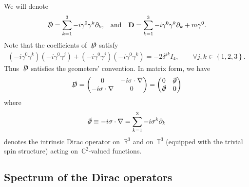 \documentclass[11pt,final]{amsart}
\newcommand{\braces}[1]{\left\{#1\right\}} %
\newcommand{\R}{\mathbb{R}}
\newcommand{\C}{\mathbb{C}}
\newcommand{\p}{\partial}
\newcommand{\D}{\slashed{D}}
\newcommand{\pd}{\slashed{\partial}}
\newcommand{\pD}{\mathbf{D}}
\begin{document}
We will denote
\begin{align}
    \D= \sum_{k=1}^3 -i\gamma^0\gamma^k\p_k, & &
    \mbox{and} & &
    \pD=\sum_{k=1}^3 -i\gamma^0\gamma^k\p_k+m\gamma^0 .
\end{align}
Note that the coefficients of~$\D$ satisfy
\begin{align}
    (-i\gamma^0\gamma^k)(-i\gamma^0\gamma^j)+ (-i\gamma^0\gamma^j)(-i\gamma^0\gamma^k)=-2\delta^{jk} I_4, \qquad \forall j,k\in \braces{1,2,3}.
\end{align}
Thus~$\D$ satisfies the geometers' convention. In matrix form, we have
\begin{align}
    \D =
    \begin{pmatrix}
        0 & -i\mathbf{\sigma}\cdot\nabla \\ -i\mathbf{\sigma}\cdot\nabla & 0
    \end{pmatrix}
    = \begin{pmatrix}
        0 & \pd \\ \pd & 0
    \end{pmatrix}
\end{align}
where
\begin{align}
    \pd\equiv -i\mathbf{\sigma}\cdot \nabla = \sum_{k=1}^3 -i\sigma^k\p_k
\end{align}
denotes the intrinsic Dirac operator on~$\R^3$ and on~$\mathbb{T}^3$ (equipped
with the trivial spin structure) acting on~$\C^2$-valued functions.

\subsection{Spectrum of the Dirac operators}
\end{document}
